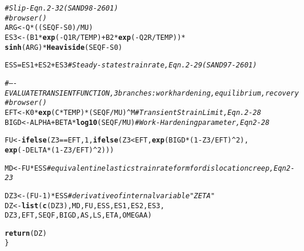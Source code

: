 \documentclass{article}\usepackage[]{graphicx}\usepackage[]{color}
\makeatletter
\newcommand{\hlnum}[1]{\textcolor[rgb]{0.686,0.059,0.569}{#1}}%
\newcommand{\hlcom}[1]{\textcolor[rgb]{0.678,0.584,0.686}{\textit{#1}}}%
\newcommand{\hlopt}[1]{\textcolor[rgb]{0,0,0}{#1}}%
\newcommand{\hlstd}[1]{\textcolor[rgb]{0.345,0.345,0.345}{#1}}%
\newcommand{\hlkwb}[1]{\textcolor[rgb]{0.69,0.353,0.396}{#1}}%
\newcommand{\hlkwd}[1]{\textcolor[rgb]{0.737,0.353,0.396}{\textbf{#1}}}%
\newenvironment{kframe}{%
 \def\at@end@of@kframe{}%
 \ifinner\ifhmode%
  \def\at@end@of@kframe{\end{minipage}}%
  \begin{minipage}{\columnwidth}%
 \fi\fi%
 \def\FrameCommand##1{\hskip\@totalleftmargin \hskip-\fboxsep
 \colorbox{shadecolor}{##1}\hskip-\fboxsep
     \hskip-\linewidth \hskip-\@totalleftmargin \hskip\columnwidth}%
 \MakeFramed {\advance\hsize-\width
   \@totalleftmargin\z@ \linewidth\hsize
   \@setminipage}}%
 {\par\unskip\endMakeFramed%
 \at@end@of@kframe}
\newenvironment{knitrout}{}{} %
\makeatother
\begin{document}
\begin{knitrout}
\begin{kframe}
\begin{alltt}
  \hlcom{# Slip - Eqn. 2-32 (SAND98-2601)}
\hlcom{#   browser()}
  \hlstd{ARG} \hlkwb{<-} \hlstd{Q} \hlopt{*} \hlstd{((SEQF} \hlopt{-} \hlstd{S0)} \hlopt{/} \hlstd{MU)}
  \hlstd{ES3} \hlkwb{<-} \hlstd{(B1} \hlopt{*} \hlkwd{exp}\hlstd{(}\hlopt{-}\hlstd{Q1R} \hlopt{/} \hlstd{TEMP)} \hlopt{+} \hlstd{B2} \hlopt{*} \hlkwd{exp}\hlstd{(}\hlopt{-}\hlstd{Q2R} \hlopt{/} \hlstd{TEMP))} \hlopt{*}
          \hlkwd{sinh}\hlstd{(ARG)} \hlopt{*} \hlkwd{Heaviside}\hlstd{(SEQF} \hlopt{-} \hlstd{S0)}

  \hlstd{ESS} \hlkwb{=} \hlstd{ES1} \hlopt{+} \hlstd{ES2} \hlopt{+} \hlstd{ES3} \hlcom{# Steady-state strain rate, Eqn. 2-29 (SAND97-2601)}

  \hlcom{# ---- EVALUATE TRANSIENT FUNCTION, 3 branches: work hardening, equilibrium, recovery}
\hlcom{#   browser()}
  \hlstd{EFT}  \hlkwb{<-} \hlstd{K0} \hlopt{*} \hlkwd{exp}\hlstd{(C} \hlopt{*} \hlstd{TEMP)} \hlopt{*} \hlstd{(SEQF} \hlopt{/} \hlstd{MU)} \hlopt{^} \hlstd{M}  \hlcom{# Transient Strain Limit, Eqn. 2-28}
  \hlstd{BIGD} \hlkwb{<-} \hlstd{ALPHA} \hlopt{+} \hlstd{BETA} \hlopt{*} \hlkwd{log10}\hlstd{(SEQF} \hlopt{/} \hlstd{MU)}       \hlcom{# Work-Hardening parameter, Eqn 2-28}

  \hlstd{FU} \hlkwb{<-} \hlkwd{ifelse}\hlstd{(Z3} \hlopt{==} \hlstd{EFT,} \hlnum{1}\hlstd{,} \hlkwd{ifelse}\hlstd{(Z3} \hlopt{<} \hlstd{EFT,} \hlkwd{exp}\hlstd{(BIGD} \hlopt{*} \hlstd{(}\hlnum{1} \hlopt{-} \hlstd{Z3} \hlopt{/} \hlstd{EFT)} \hlopt{^} \hlnum{2}\hlstd{),}
                                      \hlkwd{exp}\hlstd{(}\hlopt{-}\hlstd{DELTA} \hlopt{*} \hlstd{(}\hlnum{1} \hlopt{-} \hlstd{Z3} \hlopt{/} \hlstd{EFT)} \hlopt{^} \hlnum{2}\hlstd{)))}

  \hlstd{MD} \hlkwb{<-} \hlstd{FU} \hlopt{*} \hlstd{ESS}  \hlcom{# equivalent inelastic strain rate form for dislocation creep, Eqn 2-23}

  \hlstd{DZ3} \hlkwb{<-} \hlstd{(FU} \hlopt{-} \hlnum{1}\hlstd{)} \hlopt{*} \hlstd{ESS}  \hlcom{# derivative of internal variable "ZETA"}
  \hlstd{DZ} \hlkwb{<-} \hlkwd{list}\hlstd{(}\hlkwd{c}\hlstd{(DZ3), MD, FU, ESS, ES1, ES2, ES3,}
             \hlstd{DZ3, EFT, SEQF, BIGD, AS, LS, ETA, OMEGAA)}

  \hlkwd{return}\hlstd{(DZ)}
\hlstd{\}}
\end{alltt}
\end{kframe}
\end{knitrout}
\end{document}
